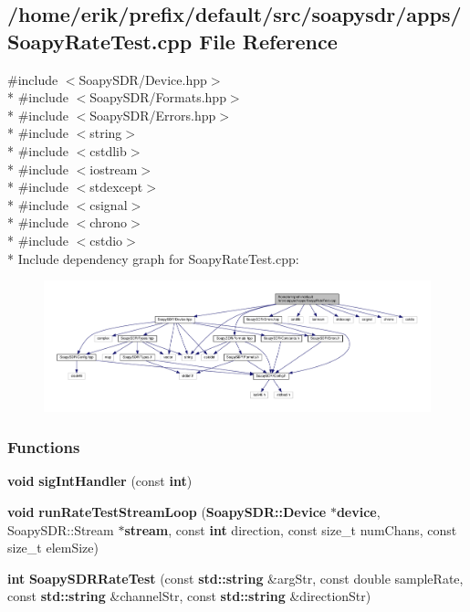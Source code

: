 \subsection{/home/erik/prefix/default/src/soapysdr/apps/\+Soapy\+Rate\+Test.cpp File Reference}
\label{SoapyRateTest_8cpp}
{\ttfamily \#include $<$Soapy\+S\+D\+R/\+Device.\+hpp$>$}\\*
{\ttfamily \#include $<$Soapy\+S\+D\+R/\+Formats.\+hpp$>$}\\*
{\ttfamily \#include $<$Soapy\+S\+D\+R/\+Errors.\+hpp$>$}\\*
{\ttfamily \#include $<$string$>$}\\*
{\ttfamily \#include $<$cstdlib$>$}\\*
{\ttfamily \#include $<$iostream$>$}\\*
{\ttfamily \#include $<$stdexcept$>$}\\*
{\ttfamily \#include $<$csignal$>$}\\*
{\ttfamily \#include $<$chrono$>$}\\*
{\ttfamily \#include $<$cstdio$>$}\\*
Include dependency graph for Soapy\+Rate\+Test.\+cpp\+:
\nopagebreak
\begin{figure}[H]
\begin{center}
\leavevmode
\includegraphics[width=350pt]{d3/d13/SoapyRateTest_8cpp__incl}
\end{center}
\end{figure}
\subsubsection*{Functions}
\begin{DoxyCompactItemize}
\item 
{\bf void} {\bf sig\+Int\+Handler} (const {\bf int})
\item 
{\bf void} {\bf run\+Rate\+Test\+Stream\+Loop} ({\bf Soapy\+S\+D\+R\+::\+Device} $\ast${\bf device}, Soapy\+S\+D\+R\+::\+Stream $\ast${\bf stream}, const {\bf int} direction, const size\+\_\+t num\+Chans, const size\+\_\+t elem\+Size)
\item 
{\bf int} {\bf Soapy\+S\+D\+R\+Rate\+Test} (const {\bf std\+::string} \&arg\+Str, const double sample\+Rate, const {\bf std\+::string} \&channel\+Str, const {\bf std\+::string} \&direction\+Str)
\end{DoxyCompactItemize}
